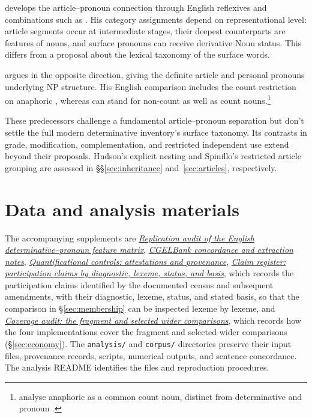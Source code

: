 \documentclass[12pt]{article}
\begin{document}
\textcite{postal1966} develops the article--pronoun connection through English reflexives and combinations such as . His category assignments depend on representational level: article segments occur at intermediate stages, their deepest counterparts are features of nouns, and surface pronouns can receive derivative Noun status. This differs from a proposal about the lexical taxonomy of the surface words.

\textcite[197--203]{sommerstein1972} argues in the opposite direction, giving the definite article and personal pronouns underlying NP structure. His English comparison includes the count restriction on anaphoric , whereas  can stand for non-count as well as count nouns.\footnote{\textcite[797--798]{payne2013anaphoric} analyse anaphoric  as a common count noun, distinct from determinative  and pronoun .}

These predecessors challenge a fundamental article--pronoun separation but don't settle the full modern determinative inventory's surface taxonomy. Its contrasts in grade, modification, complementation, and restricted independent use extend beyond their proposals. Hudson's explicit nesting and Spinillo's restricted article grouping are assessed in §§\ref{sec:inheritance} and~\ref{sec:articles}, respectively.

\section*{Data and analysis materials}

The accompanying supplements are \href{run:matrix-audit.pdf}{\textit{Replication audit of the English determinative--pronoun feature matrix}}, \href{run:corpus-documentation.pdf}{\textit{CGELBank concordance and extraction notes}}, \href{run:quantifier-controls.pdf}{\textit{Quantificational controls: attestations and provenance}}, \href{run:claim-register.pdf}{\textit{Claim register: participation claims by diagnostic, lexeme, status, and basis}}, which records the participation claims identified by the documented census and subsequent amendments, with their diagnostic, lexeme, status, and stated basis, so that the comparison in §\ref{sec:membership} can be inspected lexeme by lexeme, and \href{run:coverage-audit.pdf}{\textit{Coverage audit: the fragment and selected wider comparisons}}, which records how the four implementations cover the fragment and selected wider comparisons (§\ref{sec:economy}). The \texttt{analysis/} and \texttt{corpus/} directories preserve their input files, provenance records, scripts, numerical outputs, and sentence concordance. The analysis README identifies the files and reproduction procedures.

\clearpage
\printbibliography
\end{document}
